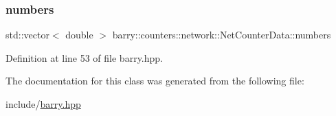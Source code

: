 \mbox{\label{classbarry_1_1counters_1_1network_1_1_net_counter_data_a720381c090feafdf9652f0ca19c5cc4b}} 
\subsubsection{\texorpdfstring{numbers}{numbers}}
{\footnotesize\ttfamily std\+::vector$<$ double $>$ barry\+::counters\+::network\+::\+Net\+Counter\+Data\+::numbers}



Definition at line 53 of file barry.\+hpp.



The documentation for this class was generated from the following file\+:\begin{DoxyCompactItemize}
\item 
include/\hyperlink{barry_8hpp}{barry.\+hpp}\end{DoxyCompactItemize}
